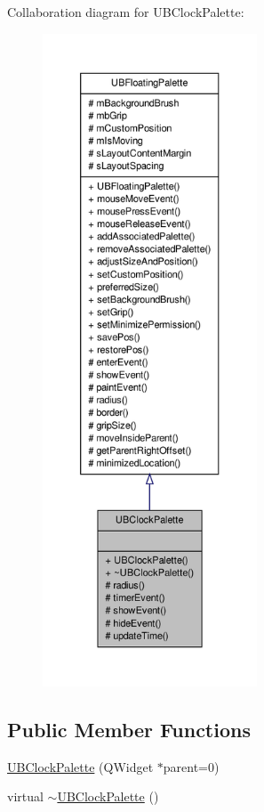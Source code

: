 Collaboration diagram for U\-B\-Clock\-Palette\-:
\nopagebreak
\begin{figure}[H]
\begin{center}
\leavevmode
\includegraphics[height=550pt]{da/d04/class_u_b_clock_palette__coll__graph}
\end{center}
\end{figure}
\subsection*{Public Member Functions}
\begin{DoxyCompactItemize}
\item 
\hyperlink{class_u_b_clock_palette_a531f8b7b8bc95b30033b55baeecac4a0}{U\-B\-Clock\-Palette} (Q\-Widget $\ast$parent=0)
\item 
virtual \hyperlink{class_u_b_clock_palette_a499cc1d1333ae3076ddce3482fc52a6f}{$\sim$\-U\-B\-Clock\-Palette} ()
\end{DoxyCompactItemize}
